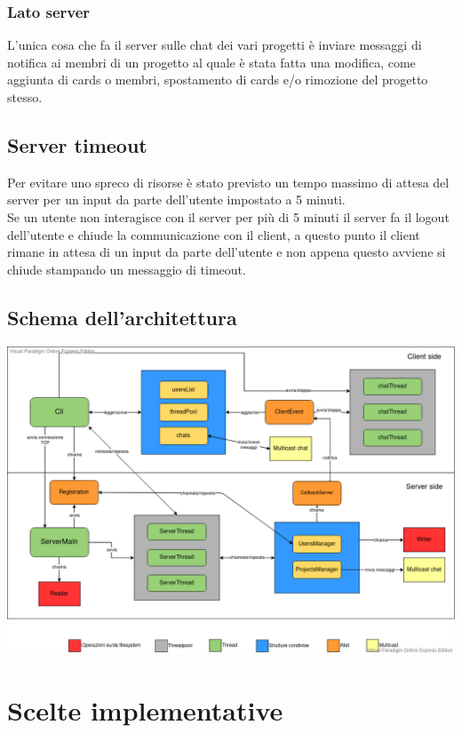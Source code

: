 \documentclass[11pt]{report}
\begin{document}
	\subsection{Lato server}
	L'unica cosa che fa il server sulle chat dei vari progetti è inviare messaggi di notifica ai membri di un progetto al quale è stata fatta una modifica, come aggiunta di cards o membri, spostamento di cards e/o rimozione del progetto stesso.
	
	\section{Server timeout}
	Per evitare uno spreco di risorse è stato previsto un tempo massimo di attesa del server per un input da parte dell'utente impostato a 5 minuti. \\
	Se un utente non interagisce con il server per più di 5 minuti il server fa il logout dell'utente e chiude la communicazione con il client, a questo punto il client rimane in attesa di un input da parte dell'utente e non appena questo avviene si chiude stampando un messaggio di timeout. \\
	
	\section{Schema dell'architettura}
	\begin{center}
		\includegraphics[width=1\textwidth]{project-architecture}
	\end{center}
	
	\chapter{Scelte implementative}
\end{document}
